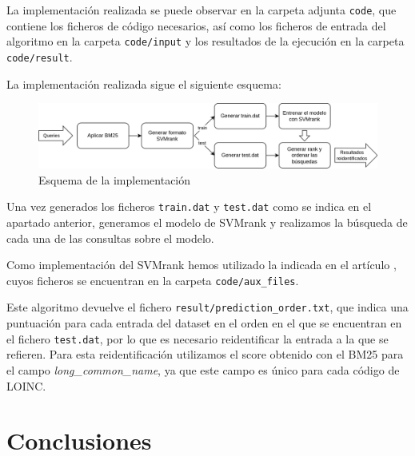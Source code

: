 \documentclass[a4paper,12pt]{article}
\begin{document}
	La implementación realizada se puede observar en la carpeta adjunta \texttt{code}, que contiene los ficheros de código necesarios, así como los ficheros de entrada del algoritmo en la carpeta \texttt{code/input} y los resultados de la ejecución en la carpeta \texttt{code/result}.
	
	La implementación realizada sigue el siguiente esquema:
	
	\begin{figure}[H]
		\centering
		\includegraphics[width=\textwidth]{include/esquema_implementacion.png}
		\caption{Esquema de la implementación}
	\end{figure}
	
	Una vez generados los ficheros \texttt{train.dat} y \texttt{test.dat} como se indica en el apartado anterior, generamos el modelo de SVMrank y realizamos la búsqueda de cada una de las consultas sobre el modelo. 
	
	Como implementación del SVMrank hemos utilizado la indicada en el artículo \cite{articulo-clase}, cuyos ficheros se encuentran en la carpeta \texttt{code/aux\_files}.
	
	Este algoritmo devuelve el fichero \texttt{result/prediction\_order.txt}, que indica una puntuación para cada entrada del dataset en el orden en el que se encuentran en el fichero \texttt{test.dat}, por lo que es necesario reidentificar la entrada a la que se refieren. Para esta reidentificación utilizamos el score obtenido con el BM25 para el campo \textit{long\_common\_name}, ya que este campo es único para cada código de LOINC.
	
	\section{Conclusiones}
	
	
	
	
	
	

	
	
	
	
\end{document}
